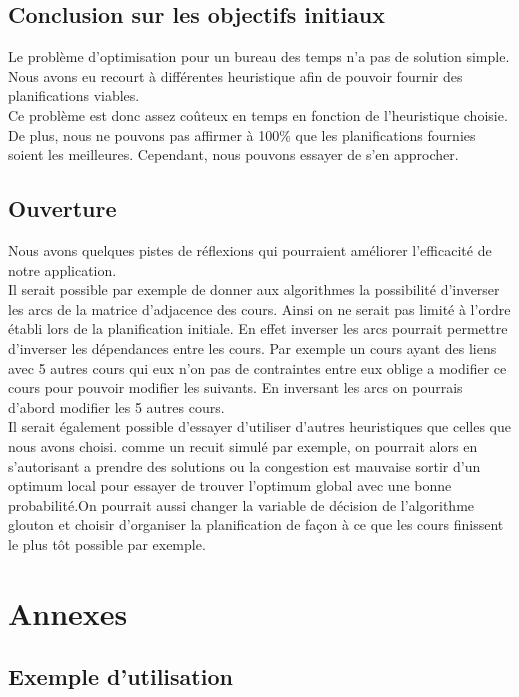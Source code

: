 \documentclass[a4paper,11pt]{article}
\begin{document}
	\subsection{Conclusion sur les objectifs initiaux}
		Le problème d'optimisation pour un bureau des temps n'a pas de solution simple. Nous avons eu recourt à différentes heuristique afin de pouvoir fournir des planifications viables.\\
		Ce problème est donc assez coûteux en temps en fonction de l'heuristique choisie. De plus, nous ne pouvons pas affirmer à 100\% que les planifications fournies soient les meilleures. Cependant, nous pouvons essayer de s'en approcher.

	\subsection{Ouverture}
		Nous avons quelques pistes de réflexions qui pourraient améliorer l'efficacité de notre application.\\
		Il serait possible par exemple de donner aux algorithmes la possibilité d'inverser les arcs de la matrice d'adjacence des cours. Ainsi on ne serait pas limité à l'ordre établi lors de la planification initiale. En effet inverser les arcs pourrait permettre d'inverser les dépendances entre les cours. Par exemple un cours ayant des liens avec 5 autres cours qui eux n'on pas de contraintes entre eux oblige a modifier ce cours pour pouvoir modifier les suivants. En inversant les arcs on pourrais d'abord modifier les 5 autres cours. \\
		Il serait également possible d'essayer d'utiliser d'autres heuristiques que celles que nous avons choisi. comme un recuit simulé par exemple, on pourrait alors en s'autorisant a prendre des solutions ou la congestion est mauvaise sortir d'un optimum local pour essayer de trouver l'optimum global avec une bonne probabilité.On pourrait aussi changer la variable de décision de l'algorithme glouton et choisir d'organiser la planification de façon à ce que les cours finissent le plus tôt possible par exemple.


\newpage
\section{Annexes}
	\subsection{Exemple d'utilisation}
\end{document}
